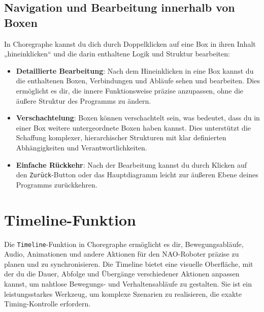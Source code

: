 \subsection{Navigation und Bearbeitung innerhalb von Boxen}
In Choregraphe kannst du dich durch Doppelklicken auf eine Box in ihren Inhalt „hineinklicken“ und die darin enthaltene Logik und Struktur bearbeiten:
\begin{itemize}
    \item \textbf{Detaillierte Bearbeitung}: Nach dem Hineinklicken in eine Box kannst du die enthaltenen Boxen, Verbindungen und Abläufe sehen und bearbeiten. Dies ermöglicht es dir, die innere Funktionsweise präzise anzupassen, ohne die äußere Struktur des Programms zu ändern.
    \item \textbf{Verschachtelung}: Boxen können verschachtelt sein, was bedeutet, dass du in einer Box weitere untergeordnete Boxen haben kannst. Dies unterstützt die Schaffung komplexer, hierarchischer Strukturen mit klar definierten Abhängigkeiten und Verantwortlichkeiten.
    \item \textbf{Einfache Rückkehr}: Nach der Bearbeitung kannst du durch Klicken auf den \texttt{Zurück}-Button oder das Hauptdiagramm leicht zur äußeren Ebene deines Programms zurückkehren.
\end{itemize}

\section{Timeline-Funktion}
Die \texttt{Timeline}-Funktion in Choregraphe ermöglicht es dir, Bewegungsabläufe, Audio, Animationen und andere Aktionen für den NAO-Roboter präzise zu planen und zu synchronisieren. Die Timeline bietet eine visuelle Oberfläche, mit der du die Dauer, Abfolge und Übergänge verschiedener Aktionen anpassen kannst, um nahtlose Bewegungs- und Verhaltensabläufe zu gestalten. Sie ist ein leistungsstarkes Werkzeug, um komplexe Szenarien zu realisieren, die exakte Timing-Kontrolle erfordern.

